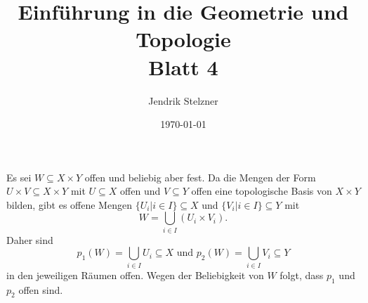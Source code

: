 \documentclass[a4paper,10pt]{article}
\title{\sc Einführung in die Geometrie und Topologie \\ \Large Blatt 4}
\author{Jendrik Stelzner}
\date{\today}
\begin{document}
\maketitle





\section{}


\subsection{}
Es sei $W \subseteq X \times Y$ offen und beliebig aber fest. Da die Mengen der Form $U \times V \subseteq X \times Y$ mit $U \subseteq X$ offen und $V \subseteq Y$ offen eine topologische Basis von $X \times Y$ bilden, gibt es offene Mengen  $\{U_i | i \in I\} \subseteq X$ und $\{V_i | i \in I\} \subseteq Y$ mit
\[
 W = \bigcup_{i \in I} (U_i \times V_i).
\]
Daher sind
\[
 p_1(W) = \bigcup_{i \in I} U_i \subseteq X \text{ und } p_2(W) = \bigcup_{i \in I} V_i \subseteq Y
\]
in den jeweiligen Räumen offen. Wegen der Beliebigkeit von $W$ folgt, dass $p_1$ und $p_2$ offen sind.
\end{document}
